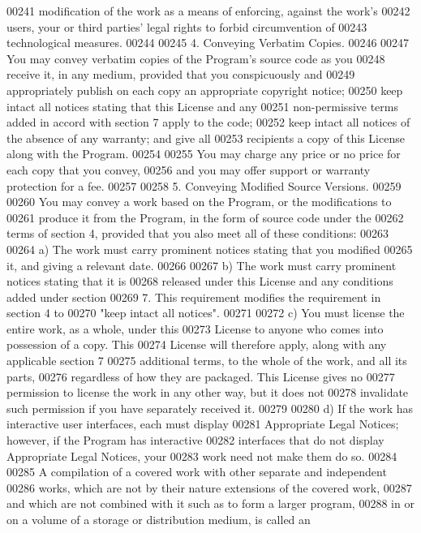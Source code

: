 \begin{DoxyCode}
00241 modification of the work as a means of enforcing, against the work's
00242 users, your or third parties' legal rights to forbid circumvention of
00243 technological measures.
00244 
00245   4. Conveying Verbatim Copies.
00246 
00247   You may convey verbatim copies of the Program's source code as you
00248 receive it, in any medium, provided that you conspicuously and
00249 appropriately publish on each copy an appropriate copyright notice;
00250 keep intact all notices stating that this License and any
00251 non-permissive terms added in accord with section 7 apply to the code;
00252 keep intact all notices of the absence of any warranty; and give all
00253 recipients a copy of this License along with the Program.
00254 
00255   You may charge any price or no price for each copy that you convey,
00256 and you may offer support or warranty protection for a fee.
00257 
00258   5. Conveying Modified Source Versions.
00259 
00260   You may convey a work based on the Program, or the modifications to
00261 produce it from the Program, in the form of source code under the
00262 terms of section 4, provided that you also meet all of these conditions:
00263 
00264     a) The work must carry prominent notices stating that you modified
00265     it, and giving a relevant date.
00266 
00267     b) The work must carry prominent notices stating that it is
00268     released under this License and any conditions added under section
00269     7.  This requirement modifies the requirement in section 4 to
00270     "keep intact all notices".
00271 
00272     c) You must license the entire work, as a whole, under this
00273     License to anyone who comes into possession of a copy.  This
00274     License will therefore apply, along with any applicable section 7
00275     additional terms, to the whole of the work, and all its parts,
00276     regardless of how they are packaged.  This License gives no
00277     permission to license the work in any other way, but it does not
00278     invalidate such permission if you have separately received it.
00279 
00280     d) If the work has interactive user interfaces, each must display
00281     Appropriate Legal Notices; however, if the Program has interactive
00282     interfaces that do not display Appropriate Legal Notices, your
00283     work need not make them do so.
00284 
00285   A compilation of a covered work with other separate and independent
00286 works, which are not by their nature extensions of the covered work,
00287 and which are not combined with it such as to form a larger program,
00288 in or on a volume of a storage or distribution medium, is called an

\end{DoxyCode}
